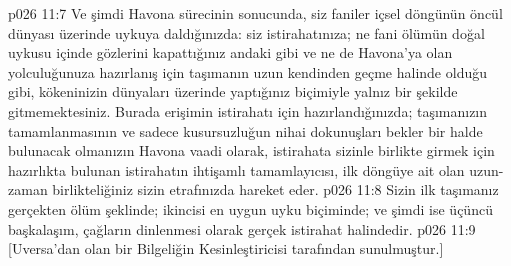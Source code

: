 \vs p026 11:7 Ve şimdi Havona sürecinin sonucunda, siz faniler içsel döngünün öncül dünyası üzerinde uykuya daldığınızda: siz istirahatınıza; ne fani ölümün doğal uykusu içinde gözlerini kapattığınız andaki gibi ve ne de Havona’ya olan yolculuğunuza hazırlanış için taşımanın uzun kendinden geçme halinde olduğu gibi, kökeninizin dünyaları üzerinde yaptığınız biçimiyle yalnız bir şekilde gitmemektesiniz. Burada erişimin istirahatı için hazırlandığınızda; taşımanızın tamamlanmasının ve sadece kusursuzluğun nihai dokunuşları bekler bir halde bulunacak olmanızın Havona vaadi olarak, istirahata sizinle birlikte girmek için hazırlıkta bulunan istirahatın ihtişamlı tamamlayıcısı, ilk döngüye ait olan uzun\hyp{}zaman birlikteliğiniz sizin etrafınızda hareket eder.
\vs p026 11:8 Sizin ilk taşımanız gerçekten ölüm şeklinde; ikincisi en uygun uyku biçiminde; ve şimdi ise üçüncü başkalaşım, çağların dinlenmesi olarak gerçek istirahat halindedir.
\vs p026 11:9 [Uversa’dan olan bir Bilgeliğin Kesinleştiricisi tarafından sunulmuştur.]
